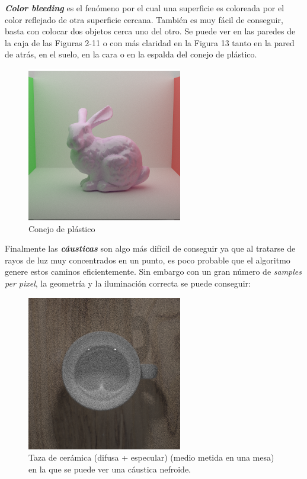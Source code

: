 \documentclass{article}
\begin{document}
\textbf{\textit{Color bleeding}} es el fenómeno por el cual una superficie es
coloreada por el color reflejado de otra superficie cercana. También es muy
fácil de conseguir, basta con colocar dos objetos cerca uno del otro. Se puede
ver en las paredes de la caja de las Figuras 2-11 o con más claridad en la
Figura 13 tanto en la pared de atrás, en el suelo, en la cara o en la espalda
del conejo de plástico. \\

\begin{figure}[H]
\centering
\includegraphics[width=0.6\linewidth]{imgs/plastic_bunny.png}
\caption{Conejo de plástico}
\end{figure}

Finalmente las \textbf{\textit{cáusticas}} son algo más difícil de conseguir ya
que al tratarse de rayos de luz muy concentrados en un punto, es poco probable
que el algoritmo genere estos caminos eficientemente. Sin embargo con un gran
número de \textit{samples per pixel}, la geometría y la iluminación correcta se
puede conseguir:
\begin{figure}[H]
\centering
\includegraphics[width=0.6\linewidth]{imgs/nephroid.png}
\caption{Taza de cerámica (difusa + especular) (medio metida en una mesa) en la
  que se puede ver una cáustica nefroide.}
\end{figure}
\end{document}

